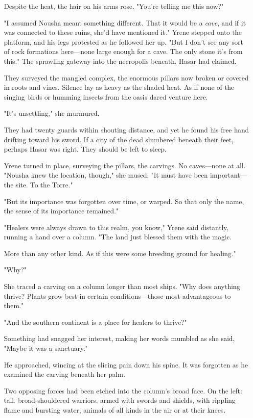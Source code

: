 Despite the heat, the hair on his arms rose. "You're telling me this now?"

"I assumed Nousha meant something different. That it would be a
\emph{cave}, and if it was connected to these ruins, she'd have mentioned it." Yrene stepped onto the platform, and his legs protested as he followed her up. "But I don't see any sort of rock formations here---none large enough for a cave. The only stone  it's from this." The sprawling gateway into the necropolis beneath, Hasar had claimed.

They surveyed the mangled complex, the enormous pillars now broken or covered in roots and vines. Silence lay as heavy as the shaded heat. As if none of the singing birds or humming insects from the oasis dared venture here.

"It's unsettling," she murmured.

They had twenty guards within shouting distance, and yet he found his free hand drifting toward his sword. If a city of the dead slumbered beneath their feet, perhaps Hasar was right. They should be left to sleep.

Yrene turned in place, surveying the pillars, the carvings. No caves---none at all. "Nousha knew the location, though," she mused. "It must have been important---the site. To the Torre."

"But its importance was forgotten over time, or warped. So that only the name, the sense of its importance remained."

"Healers were always drawn to this realm, you know," Yrene said distantly, running a hand over a column. "The land just 
blessed them with the magic.

More than any other kind. As if this were some breeding ground for healing."

"Why?"

She traced a carving on a column longer than most ships. "Why does anything thrive? Plants grow best in certain conditions---those most advantageous to them."

"And the southern continent is a place for healers to thrive?"

Something had snagged her interest, making her words mumbled as she said, "Maybe it was a sanctuary."

He approached, wincing at the slicing pain down his spine. It was forgotten as he examined the carving beneath her palm.

Two opposing forces had been etched into the column's broad face. On the left: tall, broad-shouldered warriors, armed with swords and shields, with rippling flame and bursting water, animals of all kinds in the air or at their knees.

